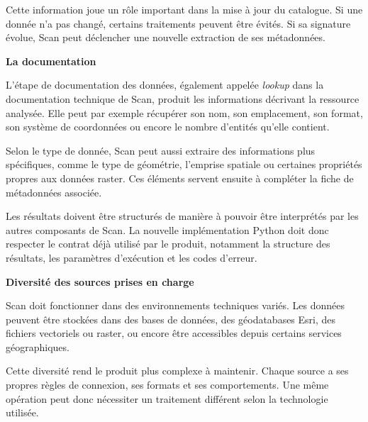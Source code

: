 Cette information joue un rôle important dans la mise à jour du catalogue. Si
une donnée n'a pas changé, certains traitements peuvent être évités. Si sa
signature évolue, Scan peut déclencher une nouvelle extraction de ses
métadonnées.

\medskip

\noindent
\textbf{La documentation}

\medskip

L'étape de documentation des données, également appelée \textit{lookup} dans la documentation
technique de Scan, produit les informations décrivant la ressource analysée.
Elle peut par exemple récupérer son nom, son emplacement, son format, son
système de coordonnées ou encore le nombre d'entités qu'elle contient.

Selon le type de donnée, Scan peut aussi extraire des informations plus
spécifiques, comme le type de géométrie, l'emprise spatiale ou certaines
propriétés propres aux données raster. Ces éléments servent ensuite à compléter
la fiche de métadonnées associée.

Les résultats doivent être structurés de manière à pouvoir être interprétés par
les autres composants de Scan. La nouvelle implémentation Python doit donc
respecter le contrat déjà utilisé par le produit, notamment la structure des
résultats, les paramètres d'exécution et les codes d'erreur.


\medskip

\noindent
\textbf{Diversité des sources prises en charge}

\medskip

Scan doit fonctionner dans des environnements techniques variés. Les données
peuvent être stockées dans des bases de données, des géodatabases Esri, des
fichiers vectoriels ou raster, ou encore être accessibles depuis certains
services géographiques.

Cette diversité rend le produit plus complexe à maintenir. Chaque source a ses
propres règles de connexion, ses formats et ses comportements. Une même
opération peut donc nécessiter un traitement différent selon la technologie
utilisée.


